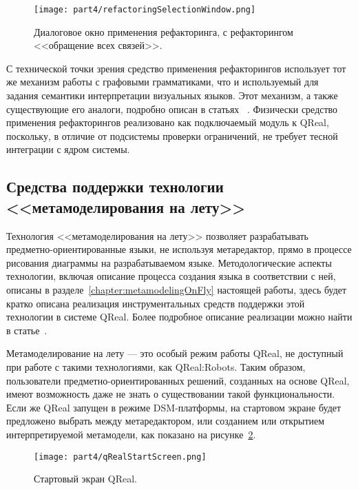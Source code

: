 \begin{figure} [ht]
	\begin{center}
		\texttt{[image: part4/refactoringSelectionWindow.png]}
		\caption{Диалоговое окно применения рефакторинга, с рефакторингом <<обращение всех связей>>.}
		\label{image:refactoringSelectionWindow}
	\end{center}
\end{figure}

С технической точки зрения средство применения рефакторингов использует тот же механизм 
работы с графовыми грамматиками, что и используемый для задания семантики интерпретации 
визуальных языков. Этот механизм, а также существующие его аналоги, подробно описан в статьях%
~\cite{polyakov2013interpreters, polyakov2013semantics, polyakov2012semantics, polyakov2012interpreter}.
Физически средство применения рефакторингов реализовано как подключаемый модуль к 
QReal, поскольку, в отличие от подсистемы проверки ограничений, не требует тесной 
интеграции с ядром системы.

\subsection{Средства поддержки технологии <<метамоделирования на лету>>}
Технология <<метамоделирования на лету>> позволяет разрабатывать предметно-ориентированные 
языки, не используя метаредактор, прямо в процессе рисования диаграммы на разрабатываемом 
языке. Методологические аспекты технологии, включая описание процесса создания языка 
в соответствии с ней, описаны в разделе~\ref{chapter:metamodelingOnFly} настоящей 
работы, здесь будет кратко описана реализация инструментальных средств поддержки этой 
технологии в системе QReal. Более подробное описание реализации можно найти в статье~\cite{ptakhina2013metamodeling}.

Метамоделирование на лету --- это особый режим работы QReal, не доступный при работе 
с такими технологиями, как QReal:Robots. Таким образом, пользователи предметно-ориентированных 
решений, созданных на основе QReal, имеют возможность даже не знать о существовании 
такой функциональности. Если же QReal запущен в режиме \ac{DSM}-платформы, на стартовом 
экране будет предложено выбрать между метаредактором, или созданием или открытием 
интерпретируемой метамодели, как показано на рисунке~\ref{image:qRealStartScreen}.

\begin{figure} [ht]
	\begin{center}
		\texttt{[image: part4/qRealStartScreen.png]}
		\caption{Стартовый экран QReal.}
		\label{image:qRealStartScreen}
	\end{center}
\end{figure}

